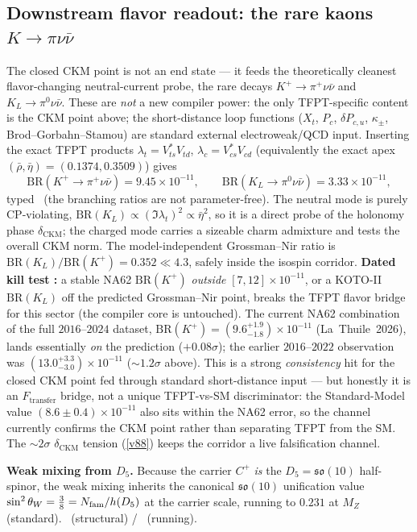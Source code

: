\subsection{Downstream flavor readout: the rare kaons $K\to\pi\nu\bar\nu$}
\label{sec:rare-kaon}
The closed CKM point is not an end state --- it feeds the theoretically cleanest flavor-changing
neutral-current probe, the rare decays $K^+\!\to\pi^+\nu\bar\nu$ and $K_L\to\pi^0\nu\bar\nu$. These are
\emph{not} a new compiler power: the only TFPT-specific content is the CKM point above; the short-distance
loop functions ($X_t$, $P_c$, $\delta P_{c,u}$, $\kappa_\pm$, Brod--Gorbahn--Stamou) are standard external
electroweak/QCD input. Inserting the exact TFPT products $\lambda_t=V_{ts}^*V_{td}$, $\lambda_c=V_{cs}^*V_{cd}$
(equivalently the exact apex $(\bar\rho,\bar\eta)=(0.1374,0.3509)$) gives 
\[
  \mathrm{BR}(K^+\!\to\pi^+\nu\bar\nu)=9.45\times10^{-11},\qquad
  \mathrm{BR}(K_L\to\pi^0\nu\bar\nu)=3.33\times10^{-11},
\]
typed \mC\ (the branching ratios are not parameter-free). The neutral mode is purely CP-violating,
$\mathrm{BR}(K_L)\propto(\Im\lambda_t)^2\propto\bar\eta^2$, so it is a direct probe of the holonomy phase
$\delta_{\mathrm{CKM}}$; the charged mode carries a sizeable charm admixture and tests the overall CKM norm.
The model-independent Grossman--Nir ratio is $\mathrm{BR}(K_L)/\mathrm{BR}(K^+)=0.352\ll4.3$, safely inside the
isospin corridor. \textbf{Dated kill test \mX:} a stable NA62 $\mathrm{BR}(K^+)$ \emph{outside}
$[7,12]\times10^{-11}$, or a KOTO-II $\mathrm{BR}(K_L)$ off the predicted Grossman--Nir point, breaks the TFPT
flavor bridge for this sector (the compiler core is untouched). The current NA62 combination of the full
$2016$--$2024$ dataset, $\mathrm{BR}(K^+)=(9.6^{+1.9}_{-1.8})\times10^{-11}$ (La~Thuile~2026), lands
essentially \emph{on} the prediction ($+0.08\sigma$); the earlier $2016$--$2022$ observation was
$(13.0^{+3.3}_{-3.0})\times10^{-11}$ ($\sim1.2\sigma$ above). This is a strong \emph{consistency} hit for the
closed CKM point fed through standard short-distance input --- but honestly it is an $F_{\mathrm{transfer}}$
bridge, not a unique TFPT-vs-SM discriminator: the Standard-Model value $(8.6\pm0.4)\times10^{-11}$ also sits
within the NA62 error, so the channel currently confirms the CKM point rather than separating TFPT from the SM.
The $\sim2\sigma$ $\delta_{\mathrm{CKM}}$ tension (\vref{v88}) keeps the corridor a live falsification channel.

\noindent\textbf{Weak mixing from $D_5$.} Because the carrier $C^+$ \emph{is} the $D_5=\mathfrak{so}(10)$
half-spinor, the weak mixing inherits the canonical $\mathfrak{so}(10)$ unification value
$\sin^2\theta_W=\tfrac38=N_{\mathrm{fam}}/h(D_5)$ at the carrier scale, running to $0.231$ at $M_Z$ (standard).
\mE\ (structural) / \mC\ (running).

